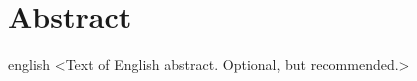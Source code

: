 \chapter*{Abstract}             %
\label{chap:abstract}           %

\begin{otherlanguage*}{english}
  <Text of English abstract. Optional, but recommended.>
\end{otherlanguage*}
